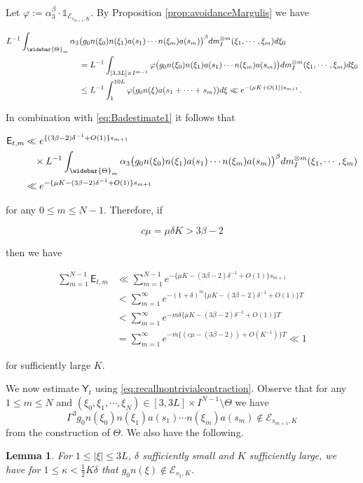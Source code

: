 \documentclass[12pt]{amsart}
\newtheorem{lem}[thm]{Lemma}
\theoremstyle{definition}
\theoremstyle{remark}
\numberwithin{equation}{section}
\newcommand{\del}{\delta}
\newcommand{\cE}{\mathcal{E}}
\newcommand{\eq}[1]
{
\begin{equation*}
{#1}
\end{equation*}
}
\newcommand{\eqlabel}[2]
{
\begin{equation}
{#2}\label{#1}
\end{equation}
}
\begin{document}
    Let $\varphi:=\alpha_3^{\beta}\cdot\mathds{1}_{\cE_{s_{m+1},K}}$. By Proposition \ref{prop:avoidanceMargulis} we have
    \eq{\begin{aligned}\label{eq:thetabarint}
        L^{-1}\int_{\widebar{\Theta}_m}\alpha_3&\big(g_0n(\xi_0)n(\xi_1)a(s_1)\cdots n(\xi_m)a(s_m)\big)^{\beta}dm_I^{\otimes m}(\xi_1,\cdots,\xi_m)d\xi_0\\&=L^{-1}\int_{[3,3L]\times I^{m-1}}\varphi\big(g_0n(\xi_0)n(\xi_1)a(s_1)\cdots n(\xi_m)a(s_m)\big)dm_I^{\otimes m}(\xi_1,\cdots,\xi_m)d\xi_0\\&\leq L^{-1}\int_{1}^{10L}\varphi(g_0n(\xi)a(s_1+\cdots+s_m))d\xi\ll e^{-(\mu K+O(1))s_{m+1}}.
    \end{aligned}}
    
    In combination with \eqref{eq:Badestimate1} it follows that
    \eqlabel{eq:Badestimate3}{\begin{aligned}\mathsf{E}_{t,m}&\ll e^{\{(3\beta-2)\delta^{-1}+O(1)\}s_{m+1}}  \\ & \quad \times L^{-1} \int_{\widebar{\Theta}_m}\alpha_3\big(g_0n(\xi_0)n(\xi_1)a(s_1)\cdots n(\xi_m)a(s_m)\big)^{\beta}dm_I^{\otimes m}(\xi_1,\cdots,\xi_m)\\&\ll e^{-\{\mu K-(3\beta-2)\delta^{-1}+O(1)\}s_{m+1}}
    \end{aligned}}
    for any $0\leq m\leq N-1$. Therefore, if 
    \eqlabel{eq:Condition1}{c\mu=\mu \delta K >3\beta -2}
    then we have
    \eqlabel{eq:Ebound}{\begin{aligned}
        \sum_{m=1}^{N-1}\mathsf{E}_{t,m} &\ll  \sum_{m=1}^{N-1}e^{-\{\mu K-(3\beta-2)\delta^{-1}+O(1)\}s_{m+1}}\\&< \sum_{m=1}^{\infty} e^{-(1+\del)^m\{\mu K-(3\beta-2)\delta^{-1}+O(1)\}T}\\&<\sum_{m=1}^{\infty} e^{-m\del\{\mu K-(3\beta-2)\delta^{-1}+O(1)\} T}\\&=\sum_{m=1}^{\infty} e^{-m\{(c\mu -(3\beta-2))+O(K^{-1})\} T}\ll 1
    \end{aligned}}
    for sufficiently large $K$.

    We now estimate $\mathsf{Y}_t$ using \eqref{eq:recallnontrivialcontraction}. Observe that for any $1\leq m\leq N$ and $(\xi_0, \xi_1,\cdots,\xi_{N})\in [3,3L]\times I^{N-1}\setminus\Theta$ we have 
    $$\Gamma^3 g_0n(\xi_0)n(\xi_1)a(s_1)\cdots n(\xi_m)a(s_m)\notin \cE_{s_{m+1},K}$$ from the construction of $\Theta$.
    We also have the following.
   \begin{lem}
    \label{lem:initialDiophantine}
    For $1 \leq |\xi| \leq 3L$, $\delta$ sufficiently small and $K$ sufficiently large, we have for $1 \leq \kappa < \tfrac{1}{2} K \delta$ that $g_0 n(\xi) \not\in \cE_{s_1, K}$.
  \end{lem}
\end{document}
